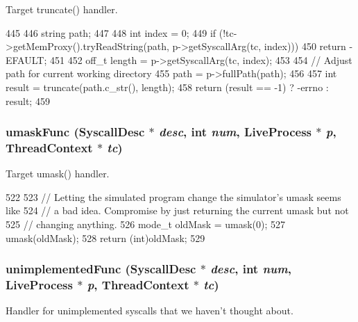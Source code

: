 Target truncate() handler. 


\begin{DoxyCode}
445 {
446     string path;
447 
448     int index = 0;
449     if (!tc->getMemProxy().tryReadString(path, p->getSyscallArg(tc, index)))
450         return -EFAULT;
451 
452     off_t length = p->getSyscallArg(tc, index);
453 
454     // Adjust path for current working directory
455     path = p->fullPath(path);
456 
457     int result = truncate(path.c_str(), length);
458     return (result == -1) ? -errno : result;
459 }
\end{DoxyCode}
\hypertarget{syscall__emul_8hh_a90bdffbc29a5b2b7953ae380819fc903}{
\subsubsection[{umaskFunc}]{ umaskFunc ({\bf SyscallDesc} $\ast$ {\em desc}, \/  int {\em num}, \/  {\bf LiveProcess} $\ast$ {\em p}, \/  {\bf ThreadContext} $\ast$ {\em tc})}}
\label{syscall__emul_8hh_a90bdffbc29a5b2b7953ae380819fc903}


Target umask() handler. 


\begin{DoxyCode}
522 {
523     // Letting the simulated program change the simulator's umask seems like
524     // a bad idea.  Compromise by just returning the current umask but not
525     // changing anything.
526     mode_t oldMask = umask(0);
527     umask(oldMask);
528     return (int)oldMask;
529 }
\end{DoxyCode}
\hypertarget{syscall__emul_8hh_ac8f61c104c0b3ab72cee8268d0c5467e}{
\subsubsection[{unimplementedFunc}]{ unimplementedFunc ({\bf SyscallDesc} $\ast$ {\em desc}, \/  int {\em num}, \/  {\bf LiveProcess} $\ast$ {\em p}, \/  {\bf ThreadContext} $\ast$ {\em tc})}}
\label{syscall__emul_8hh_ac8f61c104c0b3ab72cee8268d0c5467e}


Handler for unimplemented syscalls that we haven't thought about. 


